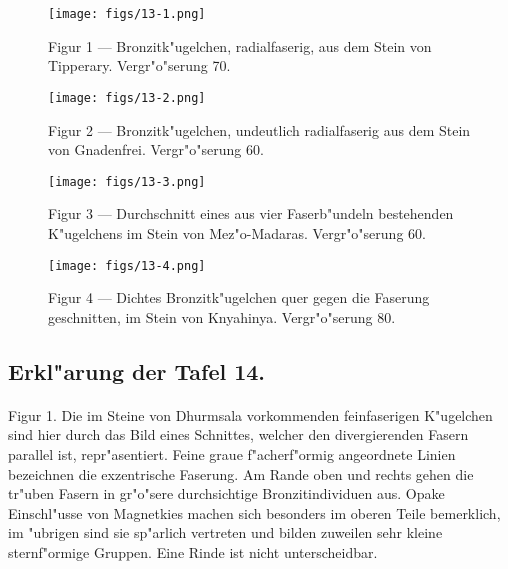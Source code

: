 \documentclass[a4paper, 11pt, oneside, polutonikogreek, german]{article}
\begin{document}
\vspace*{\fill}
\begin{figure}[H]
\centering
\texttt{[image: figs/13-1.png]}
\caption{\small Figur 1 --- Bronzitk"ugelchen, radialfaserig, aus dem Stein von Tipperary. Vergr"o"serung 70.}
\end{figure}
\vspace*{\fill}
\clearpage

\vspace*{\fill}
\begin{figure}[H]
\centering
\texttt{[image: figs/13-2.png]}
\caption{\small Figur 2 --- Bronzitk"ugelchen, undeutlich radialfaserig aus dem Stein von Gnadenfrei. Vergr"o"serung 60.}
\end{figure}
\vspace*{\fill}
\clearpage

\vspace*{\fill}
\begin{figure}[H]
\centering
\texttt{[image: figs/13-3.png]}
\caption{\small Figur 3 --- Durchschnitt eines aus vier Faserb"undeln bestehenden K"ugelchens im Stein von Mez"o-Madaras. Vergr"o"serung 60.}
\end{figure}
\vspace*{\fill}
\clearpage

\vspace*{\fill}
\begin{figure}[H]
\centering
\texttt{[image: figs/13-4.png]}
\caption{\small Figur 4 --- Dichtes Bronzitk"ugelchen quer gegen die Faserung geschnitten, im Stein von Knyahinya. Vergr"o"serung 80.}
\end{figure}
\vspace*{\fill}
\clearpage

\subsection{Erkl"arung der Tafel 14.}
\paragraph{}
Figur 1. Die im Steine von Dhurmsala vorkommenden feinfaserigen K"ugelchen sind hier durch das Bild eines Schnittes, welcher den divergierenden Fasern parallel ist, repr"asentiert. Feine graue f"acherf"ormig angeordnete Linien bezeichnen die exzentrische Faserung. Am Rande oben und rechts gehen die tr"uben Fasern in gr"o"sere durchsichtige Bronzitindividuen aus. Opake Einschl"usse von Magnetkies machen sich besonders im oberen Teile bemerklich, im "ubrigen sind sie sp"arlich vertreten und bilden zuweilen sehr kleine sternf"ormige Gruppen. Eine Rinde ist nicht unterscheidbar.
\end{document}
